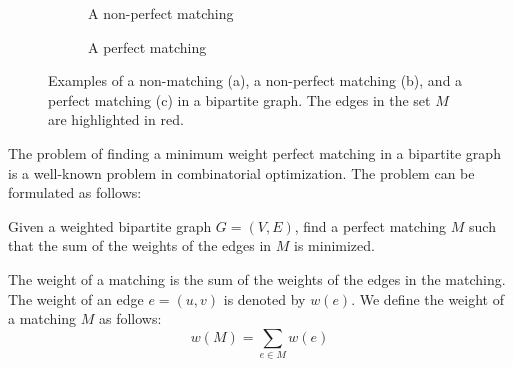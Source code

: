 \begin{example}
\begin{figure}[H]
\begin{subfigure}[b]{0.3\textwidth}
            \caption{A non-perfect matching}
            \label{fig:non_perfect_matching_style2}
        \end{subfigure}
        \hfill
        \begin{subfigure}[b]{0.3\textwidth}
            \centering
            \caption{A perfect matching}
            \label{fig:perfect_matching_style2}
        \end{subfigure}
        \caption{Examples of a non-matching (a), a non-perfect matching (b), and a perfect matching (c) in a bipartite graph. The edges in the set $M$ are highlighted in red.}
        \label{fig:matching_examples_style2}
    \end{figure}
\end{example}

The problem of finding a minimum weight perfect matching in a bipartite graph is a well-known problem in combinatorial optimization. The problem can be formulated as follows: 

\begin{definition} \label{def:mwpbm}
    Given a weighted bipartite graph $G = (V, E)$, find a perfect matching $M$ such that the sum of the weights of the edges in $M$ is minimized.
\end{definition}

The weight of a matching is the sum of the weights of the edges in the matching. The weight of an edge $e = (u, v)$ is denoted by $w(e)$. We define the weight of a matching $M$ as follows:
\begin{equation}
    w(M) = \sum_{e \in M} w(e)
\end{equation}

